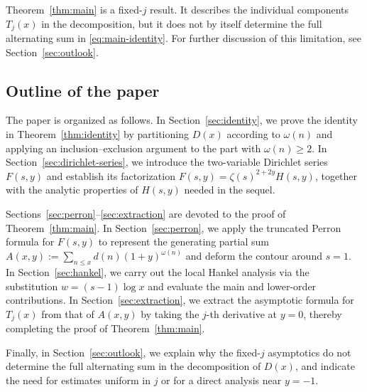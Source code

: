 Theorem~\ref{thm:main} is a fixed-$j$ result. It describes the individual components $T_j(x)$ in the decomposition, but it does not by itself determine the full alternating sum in \eqref{eq:main-identity}. For further discussion of this limitation, see Section~\ref{sec:outlook}.



\subsection{Outline of the paper}

The paper is organized as follows. In Section~\ref{sec:identity},
we prove the identity in Theorem~\ref{thm:identity} by partitioning
$D(x)$ according to $\omega(n)$ and applying an inclusion--exclusion
argument to the part with $\omega(n)\ge2$. In Section~\ref{sec:dirichlet-series},
we introduce the two-variable Dirichlet series $F(s, y)$ and establish
its factorization $F(s, y) = \zeta(s)^{2+2y} H(s, y)$, together with
the analytic properties of $H(s, y)$ needed in the sequel.

Sections~\ref{sec:perron}--\ref{sec:extraction} are devoted to the
proof of Theorem~\ref{thm:main}. In Section~\ref{sec:perron}, we
apply the truncated Perron formula for $F(s,y)$ to represent the generating partial sum $A(x, y) := \sum_{n \leq x} d(n) (1+y)^{\omega(n)}$ and deform the
contour around $s = 1$. In Section~\ref{sec:hankel}, we carry out
the local Hankel analysis via the substitution $w = (s-1) \log x$
and evaluate the main and lower-order contributions. In
Section~\ref{sec:extraction}, we extract the asymptotic formula for
$T_j(x)$ from that of $A(x, y)$ by taking the $j$-th derivative at $y=0$, thereby
completing the proof of Theorem~\ref{thm:main}.

Finally, in Section~\ref{sec:outlook}, we explain why the fixed-$j$
asymptotics do not determine the full alternating sum in the decomposition of $D(x)$, and indicate the need for estimates uniform in $j$ or for a direct analysis near $y=-1$.
